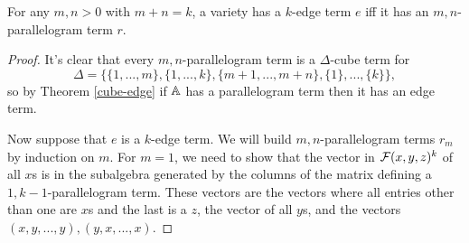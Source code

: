 \documentclass[letterpaper,11pt]{article}
\begin{document}
\begin{thm} For any $m,n > 0$ with $m+n = k$, a variety has a $k$-edge term $e$ iff it has an $m,n$-parallelogram term $r$.
\end{thm}
\begin{proof} It's clear that every $m,n$-parallelogram term is a $\Delta$-cube term for
\[
\Delta = \{\{1, ..., m\}, \{1, ..., k\}, \{m+1, ..., m+n\}, \{1\}, ..., \{k\}\},
\]
so by Theorem \ref{cube-edge} if $\mathbb{A}$ has a parallelogram term then it has an edge term.

Now suppose that $e$ is a $k$-edge term. We will build $m,n$-parallelogram terms $r_m$ by induction on $m$. For $m = 1$, we need to show that the vector in $\mathcal{F}(x,y,z)^k$ of all $x$s is in the subalgebra generated by the columns of the matrix defining a $1,k-1$-parallelogram term. These vectors are the vectors where all entries other than one are $x$s and the last is a $z$, the vector of all $y$s, and the vectors $(x,y,...,y), (y,x,...,x)$.


\end{proof}
\end{document}
